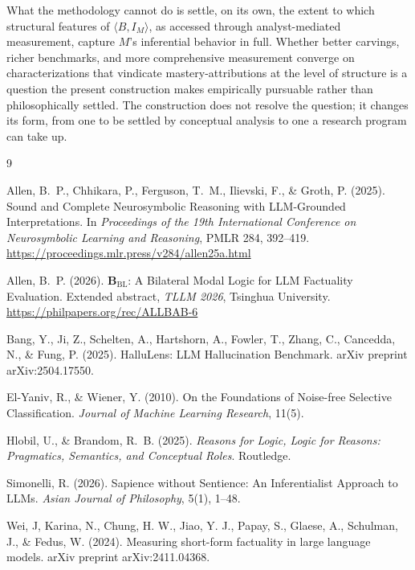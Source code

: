 \documentclass[11pt]{article}
\begin{document}

What the methodology cannot do is settle, on its own, the extent to which structural features of $\langle B, I_M \rangle$, as accessed through analyst-mediated measurement, capture $M$'s inferential behavior in full. Whether better carvings, richer benchmarks, and more comprehensive measurement converge on characterizations that vindicate mastery-attributions at the level of structure is a question the present construction makes empirically pursuable rather than philosophically settled. The construction does not resolve the question; it changes its form, from one to be settled by conceptual analysis to one a research program can take up.

\begin{thebibliography}{9}

Allen, B.~P., Chhikara, P., Ferguson, T.~M., Ilievski, F., \& Groth, P. (2025).
Sound and Complete Neurosymbolic Reasoning with LLM-Grounded Interpretations.
In \textit{Proceedings of the 19th International Conference on Neurosymbolic Learning and Reasoning}, PMLR 284, 392--419. \url{https://proceedings.mlr.press/v284/allen25a.html}

Allen, B.~P. (2026).
$\mathbf{B}_{\mathrm{BL}}$: A Bilateral Modal Logic for LLM Factuality Evaluation.
Extended abstract, \textit{TLLM 2026}, Tsinghua University. \url{https://philpapers.org/rec/ALLBAB-6}

Bang, Y., Ji, Z., Schelten, A., Hartshorn, A., Fowler, T., Zhang, C., Cancedda, N., \& Fung, P. (2025). HalluLens: LLM Hallucination Benchmark. arXiv preprint arXiv:2504.17550. 

El-Yaniv, R., \& Wiener, Y. (2010).
On the Foundations of Noise-free Selective Classification.
\textit{Journal of Machine Learning Research}, 11(5).

Hlobil, U., \& Brandom, R.~B. (2025).
\textit{Reasons for Logic, Logic for Reasons: Pragmatics, Semantics, and Conceptual Roles}.
Routledge.

Simonelli, R. (2026).
Sapience without Sentience: An Inferentialist Approach to LLMs.
\textit{Asian Journal of Philosophy}, 5(1), 1--48.

Wei, J, Karina, N., Chung, H. W., Jiao, Y. J., Papay, S., Glaese, A., Schulman, J., \& Fedus, W. (2024). Measuring short-form factuality in large language models. arXiv preprint arXiv:2411.04368.

\end{thebibliography}
\end{document}
